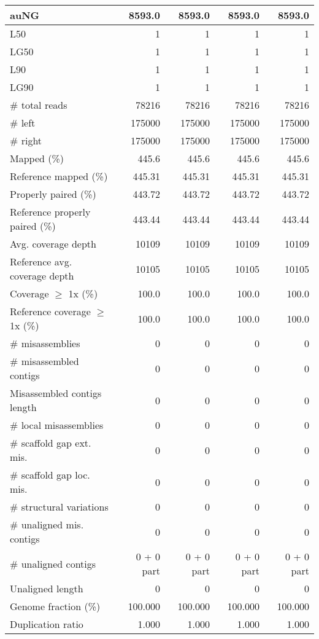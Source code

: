 \documentclass[12pt,a4paper]{article}
\begin{document}
\begin{table}[ht]
\begin{center}
\begin{tabular}{|l*{4}{|r}|}
auNG & 8593.0 & 8593.0 & 8593.0 & 8593.0 \\ \hline
L50 & 1 & 1 & 1 & 1 \\ \hline
LG50 & 1 & 1 & 1 & 1 \\ \hline
L90 & 1 & 1 & 1 & 1 \\ \hline
LG90 & 1 & 1 & 1 & 1 \\ \hline
\# total reads & 78216 & 78216 & 78216 & 78216 \\ \hline
\# left & 175000 & 175000 & 175000 & 175000 \\ \hline
\# right & 175000 & 175000 & 175000 & 175000 \\ \hline
Mapped (\%) & 445.6 & 445.6 & 445.6 & 445.6 \\ \hline
Reference mapped (\%) & 445.31 & 445.31 & 445.31 & 445.31 \\ \hline
Properly paired (\%) & 443.72 & 443.72 & 443.72 & 443.72 \\ \hline
Reference properly paired (\%) & 443.44 & 443.44 & 443.44 & 443.44 \\ \hline
Avg. coverage depth & 10109 & 10109 & 10109 & 10109 \\ \hline
Reference avg. coverage depth & 10105 & 10105 & 10105 & 10105 \\ \hline
Coverage $\geq$ 1x (\%) & 100.0 & 100.0 & 100.0 & 100.0 \\ \hline
Reference coverage $\geq$ 1x (\%) & 100.0 & 100.0 & 100.0 & 100.0 \\ \hline
\# misassemblies & 0 & 0 & 0 & 0 \\ \hline
\# misassembled contigs & 0 & 0 & 0 & 0 \\ \hline
Misassembled contigs length & 0 & 0 & 0 & 0 \\ \hline
\# local misassemblies & 0 & 0 & 0 & 0 \\ \hline
\# scaffold gap ext. mis. & 0 & 0 & 0 & 0 \\ \hline
\# scaffold gap loc. mis. & 0 & 0 & 0 & 0 \\ \hline
\# structural variations & 0 & 0 & 0 & 0 \\ \hline
\# unaligned mis. contigs & 0 & 0 & 0 & 0 \\ \hline
\# unaligned contigs & 0 + 0 part & 0 + 0 part & 0 + 0 part & 0 + 0 part \\ \hline
Unaligned length & 0 & 0 & 0 & 0 \\ \hline
Genome fraction (\%) & 100.000 & 100.000 & 100.000 & 100.000 \\ \hline
Duplication ratio & 1.000 & 1.000 & 1.000 & 1.000 \\ \hline

\end{tabular}
\end{center}
\end{table}
\end{document}
